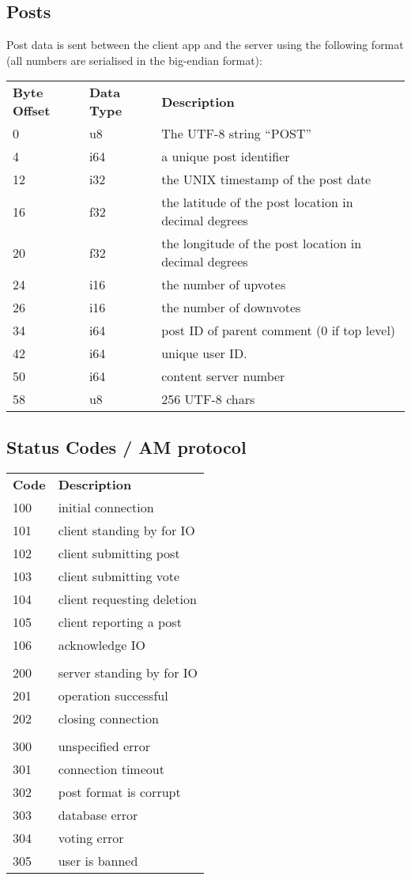 \documentclass[12pt, a4paper]{article}
\begin{document}
\subsection{Posts}
Post data is sent between the client app and the server using the following format (all numbers are serialised in the big-endian format):
\begin{table}[h]
\centering
\begin{tabular}{lll}
\textbf{Byte Offset} & \textbf{Data Type} &\textbf{Description}\\
0 & u8 & The UTF-8 string ``POST''\\
4 & i64 & a unique post identifier\\
12 & i32 & the UNIX timestamp of the post date\\
16 & f32 & the latitude of the post location in decimal degrees\\
20 & f32 & the longitude of the post location in decimal degrees\\
24 & i16 & the number of upvotes\\
26 & i16 & the number of downvotes\\
34 & i64 & post ID of parent comment (0 if top level)\\
42 & i64 & unique user ID.\\
50 & i64 & content server number\\
58 & u8 & 256 UTF-8 chars \\
\end{tabular}
\end{table}
\clearpage

\subsection{Status Codes / AM protocol}
\begin{table}[h]
\centering
\label{my-label}
\begin{tabular}{ll}
\textbf{Code} &\textbf{Description}\\
100 & initial connection\\
101 & client standing by for IO\\
102 & client submitting post\\
103 & client submitting vote\\
104 & client requesting deletion\\
105 & client reporting a post\\
106 & acknowledge IO\\
&\\
200 & server standing by for IO\\
201 & operation successful\\
202 & closing connection\\
&\\
300 & unspecified error\\
301 & connection timeout\\
302 & post format is corrupt\\
303 & database error\\
304 & voting error\\
305 & user is banned\\
\end{tabular}
\end{table}
\end{document}

